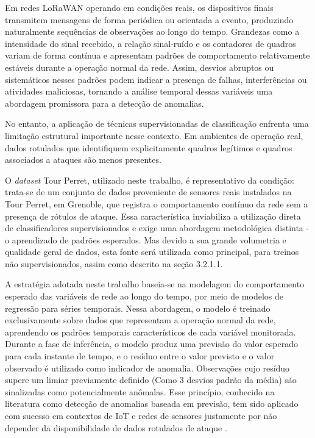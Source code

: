 Em redes LoRaWAN operando em condições reais, os dispositivos finais 
transmitem mensagens de forma periódica ou orientada a evento, produzindo 
naturalmente sequências de observações ao longo do tempo. Grandezas como a 
intensidade do sinal recebido, a relação sinal-ruído e os contadores de 
quadros variam de forma contínua e apresentam padrões de comportamento 
relativamente estáveis durante a operação normal da rede. Assim, desvios 
abruptos ou sistemáticos nesses padrões podem indicar a presença de falhas, 
interferências ou atividades maliciosas, tornando a análise temporal dessas 
variáveis uma abordagem promissora para a detecção de anomalias.

No entanto, a aplicação de técnicas supervisionadas de classificação enfrenta 
uma limitação estrutural importante nesse contexto. Em ambientes de operação 
real, dados rotulados que identifiquem explicitamente quadros legítimos e 
quadros associados a ataques são menos presentes.

 O \textit{dataset} Tour Perret, 
utilizado neste trabalho, é representativo da condição: trata-se de um 
conjunto de dados proveniente de sensores reais instalados na Tour Perret, 
em Grenoble, que registra o comportamento contínuo da rede sem a presença 
de rótulos de ataque. Essa característica inviabiliza a utilização direta 
de classificadores supervisionados e exige uma abordagem metodológica 
distinta - o aprendizado de padrões esperados. Mas devido a sua grande volumetria e qualidade geral de dados, esta fonte será utilizada como principal, para treinos não supervisionados, assim como descrito na seção 3.2.1.1.


A estratégia adotada neste trabalho baseia-se na modelagem do comportamento 
esperado das variáveis de rede ao longo do tempo, por meio de modelos de 
regressão para séries temporais. Nessa abordagem, o modelo é treinado 
exclusivamente sobre dados que representam a operação normal da rede, 
aprendendo os padrões temporais característicos de cada variável monitorada. Durante a fase de inferência, o modelo produz uma previsão do valor esperado 
para cada instante de tempo, e o resíduo entre o valor previsto e o valor 
observado é utilizado como indicador de anomalia. Observações cujo resíduo 
supere um limiar previamente definido (Como 3 desvios padrão da média) são sinalizadas como potencialmente 
anômalas. Esse princípio, conhecido na literatura como detecção de anomalias 
baseada em previsão, tem sido aplicado com sucesso em contextos de IoT e 
redes de sensores justamente por não depender da disponibilidade de dados 
rotulados de ataque \cite{chalapathy2019}.


